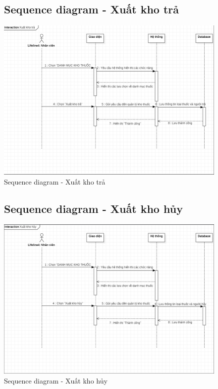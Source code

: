 \documentclass{report}
\begin{document}
\pagebreak
\begin{center}
	\begin{figure}[!htp]
		\subsection{Sequence diagram - Xuất kho trả}
		\begin{center}
			\includegraphics[scale=.4]{Hinh/Sequence diagram Xuất kho trả.png}
		\end{center}
		\caption{Sequence diagram - Xuất kho trả}
	\end{figure}
\end{center}

\pagebreak
\begin{center}
	\begin{figure}[!htp]
		\subsection{Sequence diagram - Xuất kho hủy}
		\begin{center}
			\includegraphics[scale=.35]{Hinh/Sequence diagram Xuất kho hủy.png}
		\end{center}
		\caption{Sequence diagram - Xuất kho hủy}
	\end{figure}
\end{center}
\end{document}
